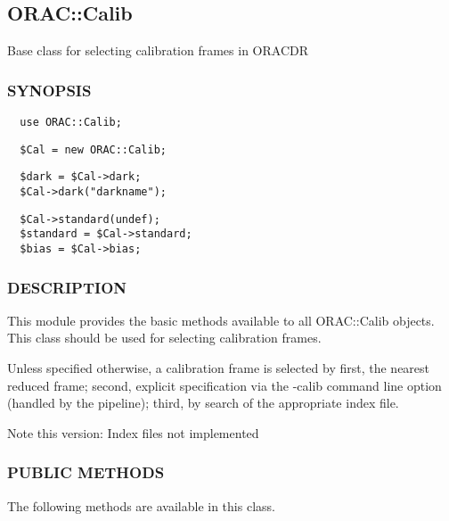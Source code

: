 \subsection{ORAC::Calib\label{ORAC::Calib}}

Base class for selecting calibration frames in ORACDR

\subsubsection*{SYNOPSIS\label{ORAC::Calib_SYNOPSIS}}\begin{verbatim}
  use ORAC::Calib;
\end{verbatim}
\begin{verbatim}
  $Cal = new ORAC::Calib;
\end{verbatim}
\begin{verbatim}
  $dark = $Cal->dark;
  $Cal->dark("darkname");
\end{verbatim}
\begin{verbatim}
  $Cal->standard(undef);
  $standard = $Cal->standard;
  $bias = $Cal->bias;
\end{verbatim}
\subsubsection*{DESCRIPTION\label{ORAC::Calib_DESCRIPTION}}

This module provides the basic methods available to all ORAC::Calib
objects. This class should be used for selecting calibration frames.



Unless specified otherwise, a calibration frame is selected by first,
the nearest reduced frame; second, explicit specification via the
-calib command line option (handled by the pipeline); third, by search
of the appropriate index file.



Note this version: Index files not implemented

\subsubsection*{PUBLIC METHODS\label{ORAC::Calib_PUBLIC_METHODS}}

The following methods are available in this class.

